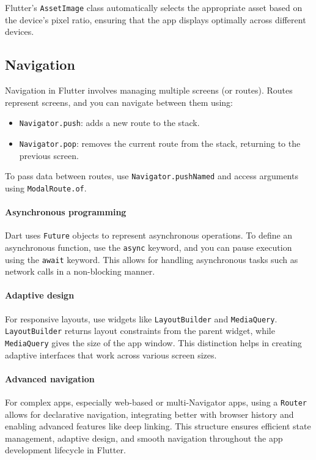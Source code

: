 Flutter's \texttt{AssetImage} class automatically selects the appropriate asset based on the device's pixel ratio, ensuring that the app displays optimally across different devices.

\subsection{Navigation}
Navigation in Flutter involves managing multiple screens (or routes). 
Routes represent screens, and you can navigate between them using:
\begin{itemize}
    \item \texttt{Navigator.push}: adds a new route to the stack.
    \item \texttt{Navigator.pop}: removes the current route from the stack, returning to the previous screen.
\end{itemize}
To pass data between routes, use \texttt{Navigator.pushNamed} and access arguments using \texttt{ModalRoute.of}.

\paragraph*{Asynchronous programming}
Dart uses \texttt{Future} objects to represent asynchronous operations. 
To define an asynchronous function, use the \texttt{async} keyword, and you can pause execution using the \texttt{await} keyword. 
This allows for handling asynchronous tasks such as network calls in a non-blocking manner.

\paragraph*{Adaptive design}
For responsive layouts, use widgets like \texttt{LayoutBuilder} and \texttt{MediaQuery}. 
\texttt{LayoutBuilder} returns layout constraints from the parent widget, while \texttt{MediaQuery} gives the size of the app window. 
This distinction helps in creating adaptive interfaces that work across various screen sizes.

\paragraph*{Advanced navigation}
For complex apps, especially web-based or multi-Navigator apps, using a \texttt{Router} allows for declarative navigation, integrating better with browser history and enabling advanced features like deep linking.
This structure ensures efficient state management, adaptive design, and smooth navigation throughout the app development lifecycle in Flutter.

